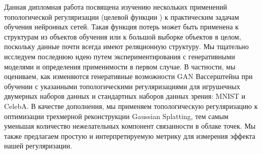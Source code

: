 Данная дипломная работа посвящена изучению нескольких применений топологической регуляризации (целевой функции ) к практическим задачам обучения нейронных сетей. Такая функция потерь может быть применена к структурам из объектов обучения или к большой выборке объектов в целом, поскольку данные почти всегда имеют реляционную структуру. Мы тщательно исследуем последнюю идею
путем экспериментирования с генеративными моделями и определения применимости в первом случае.
В частности, мы оцениваем, как изменяются генеративные возможности GAN Вассерштейна при обучении 
с указанными топологическими регуляризациями для игрушечных двумерных наборов данных и стандартных наборов данных зрения:
MNIST и CelebA. В качестве дополнения, мы применяем топологическую регуляризацию к оптимизации
трехмерной реконструкции Gaussian Splatting, тем самым уменьшая количество нежелательных
компонент связанности в облаке точек. Мы также предлагаем простую и интерпретируемую метрику для измерения эффекта нашей регуляризации.